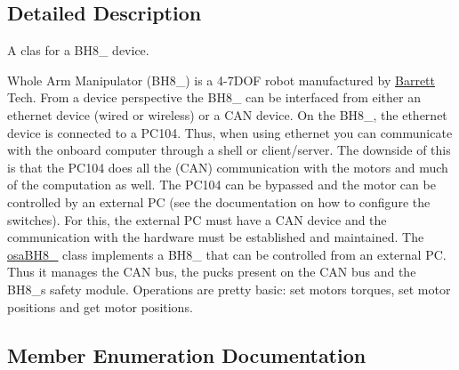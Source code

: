 \subsection{Detailed Description}
A clas for a B\+H8\+\_ device. 

Whole Arm Manipulator (B\+H8\+\_) is a 4-\/7\+D\+O\+F robot manufactured by \hyperlink{struct_barrett}{Barrett} Tech. From a device perspective the B\+H8\+\_ can be interfaced from either an ethernet device (wired or wireless) or a C\+A\+N device. On the B\+H8\+\_, the ethernet device is connected to a P\+C104. Thus, when using ethernet you can communicate with the onboard computer through a shell or client/server. The downside of this is that the P\+C104 does all the (C\+A\+N) communication with the motors and much of the computation as well. The P\+C104 can be bypassed and the motor can be controlled by an external P\+C (see the documentation on how to configure the switches). For this, the external P\+C must have a C\+A\+N device and the communication with the hardware must be established and maintained. The \hyperlink{classosa_b_h8__280}{osa\+B\+H8\+\_} class implements a B\+H8\+\_ that can be controlled from an external P\+C. Thus it manages the C\+A\+N bus, the pucks present on the C\+A\+N bus and the B\+H8\+\_\textquotesingle{}s safety module. Operations are pretty basic\+: set motors torques, set motor positions and get motor positions. 

\subsection{Member Enumeration Documentation}
\hypertarget{classosa_b_h8__280_ab8ba653b44589ea6165d12717ff97541}{}
